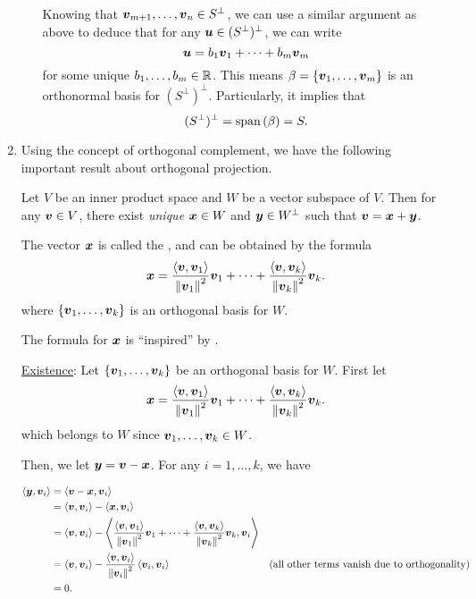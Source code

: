 \begin{enumerate}
\begin{pf}
\begin{enumerate}
Knowing that \(\vb*{v}_{m+1},\dotsc,\vb*{v}_n\in S^{\perp}\), we can use a
similar argument as above to deduce that for any \(\vb*{u}\in
(S^{\perp})^{\perp}\), we can write
\[
\vb*{u}=b_1\vb*{v}_1+\dotsb+b_m\vb*{v}_m
\]
for some unique \(b_1,\dotsc,b_m\in\mathbb{R}\). This means
\(\beta=\{\vb*{v}_1,\dotsc,\vb*{v}_m\}\) is an orthonormal basis for
\((S^{\perp})^{\perp}\). Particularly, it implies that
\[
(S^{\perp})^{\perp}=\operatorname{span}\qty(\beta)=S.
\]
\end{enumerate}
\end{pf}
\item Using the concept of orthogonal complement, we have the following
important result about orthogonal projection.
\begin{theorem}
\label{thm:orthog-decomp}
Let \(V\) be an inner product space and \(W\) be a vector subspace of \(V\).
Then for any \(\vb*{v}\in V\), there exist \emph{unique} \(\vb*{x}\in W\) and
\(\vb*{y}\in W^{\perp}\) such that \(\vb*{v}=\vb*{x}+\vb*{y}\).

The vector \(\vb*{x}\) is called the , and can be obtained by the formula
\[
\vb*{x}=\frac{\left\langle \vb*{v},\vb*{v}_1\right\rangle}{\norm{\vb*{v}_1}^{2}}\vb*{v}_1
+\dotsb+\frac{\left\langle \vb*{v},\vb*{v}_k\right\rangle}{\norm{\vb*{v}_k}^{2}}\vb*{v}_k.
\]
where \(\{\vb*{v}_1,\dotsc,\vb*{v}_k\}\) is an orthogonal basis for \(W\).
\end{theorem}
\begin{note}
The formula for \(\vb*{x}\) is ``inspired'' by .
\end{note}

\begin{pf}
\underline{Existence}: Let \(\{\vb*{v}_1,\dotsc,\vb*{v}_k\}\) be an
orthogonal basis for \(W\). First let
\[
\vb*{x}=\frac{\left\langle \vb*{v},\vb*{v}_1\right\rangle}{\norm{\vb*{v}_1}^{2}}\vb*{v}_1
+\dotsb+\frac{\left\langle \vb*{v},\vb*{v}_k\right\rangle}{\norm{\vb*{v}_k}^{2}}\vb*{v}_k.
\]
which belongs to \(W\) since \(\vb*{v}_1,\dotsc,\vb*{v}_k\in W\).

Then, we let \(\vb*{y}=\vb*{v}-\vb*{x}\). For any \(i=1,\dotsc,k\), we have
\end{pf}
\begin{align*}
\left\langle \vb*{y},\vb*{v}_i\right\rangle&=\left\langle \vb*{v}-\vb*{x},\vb*{v}_i\right\rangle \\
&=\left\langle \vb*{v},\vb*{v}_i\right\rangle-\left\langle \vb*{x},\vb*{v}_i\right\rangle \\
&=\left\langle \vb*{v},\vb*{v}_i\right\rangle-\left\langle \frac{\left\langle \vb*{v},\vb*{v}_1\right\rangle}{\norm{\vb*{v}_1}^{2}}\vb*{v}_1
+\dotsb+\frac{\left\langle \vb*{v},\vb*{v}_k\right\rangle}{\norm{\vb*{v}_k}^{2}}\vb*{v}_k,\vb*{v}_i\right\rangle \\
&=\left\langle \vb*{v},\vb*{v}_i\right\rangle-\frac{\left\langle \vb*{v},\vb*{v}_i\right\rangle}{\norm{\vb*{v}_i}^{2}}\left\langle \vb*{v}_i,\vb*{v}_i\right\rangle &\text{(all other terms vanish due to orthogonality)}\\
&=0.
\end{align*}


\end{enumerate}
